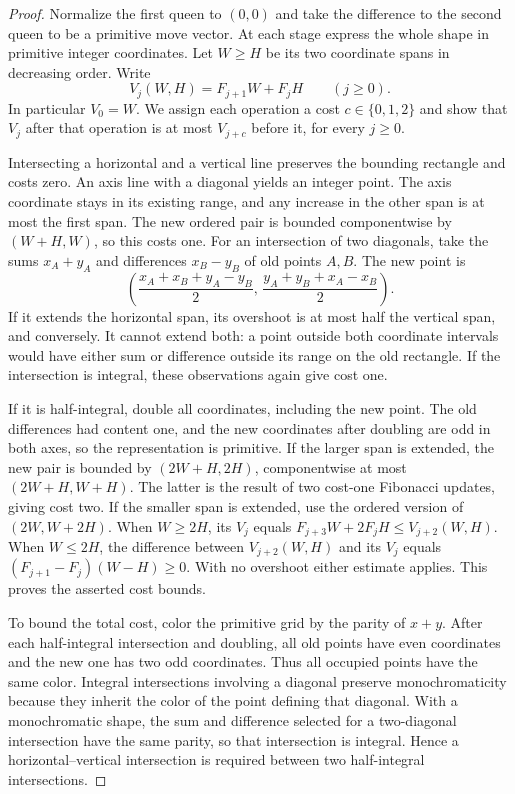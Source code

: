\documentclass[11pt]{article}
\begin{document}
\begin{proof}
Normalize the first queen to $(0,0)$ and take the difference to the second queen to be a primitive move vector. At each stage express the whole shape in primitive integer coordinates. Let $W\ge H$ be its two coordinate spans in decreasing order. Write
\[
 V_j(W,H)=F_{j+1}W+F_j H\qquad (j\ge0).
\]
In particular $V_0=W$. We assign each operation a cost $c\in\{0,1,2\}$ and show that $V_j$ after that operation is at most $V_{j+c}$ before it, for every $j\ge0$.

Intersecting a horizontal and a vertical line preserves the bounding rectangle and costs zero. An axis line with a diagonal yields an integer point. The axis coordinate stays in its existing range, and any increase in the other span is at most the first span. The new ordered pair is bounded componentwise by $(W+H,W)$, so this costs one. For an intersection of two diagonals, take the sums $x_A+y_A$ and differences $x_B-y_B$ of old points $A,B$. The new point is
\[
  \left(\frac{x_A+x_B+y_A-y_B}{2},\,
        \frac{y_A+y_B+x_A-x_B}{2}\right).
\]
If it extends the horizontal span, its overshoot is at most half the vertical span, and conversely. It cannot extend both: a point outside both coordinate intervals would have either sum or difference outside its range on the old rectangle. If the intersection is integral, these observations again give cost one.

If it is half-integral, double all coordinates, including the new point. The old differences had content one, and the new coordinates after doubling are odd in both axes, so the representation is primitive. If the larger span is extended, the new pair is bounded by $(2W+H,2H)$, componentwise at most $(2W+H,W+H)$. The latter is the result of two cost-one Fibonacci updates, giving cost two. If the smaller span is extended, use the ordered version of $(2W,W+2H)$. When $W\ge2H$, its $V_j$ equals $F_{j+3}W+2F_jH\le V_{j+2}(W,H)$. When $W\le2H$, the difference between $V_{j+2}(W,H)$ and its $V_j$ equals $(F_{j+1}-F_j)(W-H)\ge0$. With no overshoot either estimate applies. This proves the asserted cost bounds.

To bound the total cost, color the primitive grid by the parity of $x+y$. After each half-integral intersection and doubling, all old points have even coordinates and the new one has two odd coordinates. Thus all occupied points have the same color. Integral intersections involving a diagonal preserve monochromaticity because they inherit the color of the point defining that diagonal. With a monochromatic shape, the sum and difference selected for a two-diagonal intersection have the same parity, so that intersection is integral. Hence a horizontal--vertical intersection is required between two half-integral intersections.


\end{proof}
\end{document}
